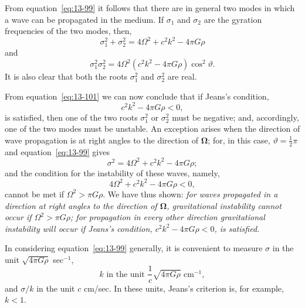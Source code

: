 From equation~\eqref{eq:13-99} it follows that there are in general two modes in which a wave can be propagated in the medium. If $\sigma_1$ and $\sigma_2$ are the gyration frequencies of the two modes, then,
\begin{equation}
\label{eq:13-100}
\sigma_1^2+\sigma_2^2 = 4\Omega^2+c^2k^2-4\pi G\rho
\end{equation}
and
\begin{equation}
\label{eq:13-101}
\sigma_1^2\sigma_2^2 = 4\Omega^2(c^2k^2-4\pi G\rho)\cos^2\!\vartheta.
\end{equation}
It is also clear that both the roots $\sigma_1^2$ and $\sigma_2^2$ are real.

From equation~\eqref{eq:13-101} we can now conclude that if Jeans's condition,
\begin{equation}
\label{eq:13-102}
c^2k^2-4\pi G\rho < 0,
\end{equation}
is satisfied, then one of the two roots $\sigma_1^2$ or $\sigma_2^2$ must be negative; and, accordingly, one of the two modes must be unstable. An exception arises when the direction of wave propagation is at right angles to the direction of $\boldsymbol{\Omega}$; for, in this case, $\vartheta = \frac{1}{2}\pi$ and equation~\eqref{eq:13-99} gives
\begin{equation}
\label{eq:13-103}
\sigma^2 = 4\Omega^2+c^2k^2-4\pi G\rho;
\end{equation}
and the condition for the instability of these waves, namely,
\begin{equation}
\label{eq:13-104}
4\Omega^2+c^2k^2-4\pi G\rho < 0,
\end{equation}
cannot be met if $\Omega^2 > \pi G\rho$. We have thus shown: \textit{for waves propagated in a direction at right angles to the direction of $\boldsymbol{\Omega}$, gravitational instability cannot occur if $\Omega^2 > \pi G\rho$; for propagation in every other direction gravitational instability will occur if Jeans's condition, $c^2k^2-4\pi G\rho < 0$, is satisfied.}

In considering equation~\eqref{eq:13-99} generally, it is convenient to measure $\sigma$ in the unit $\sqrt{4\pi G\rho}$ sec$^{-1}$,
\begin{equation}
\label{eq:13-105}
k \text{ in the unit }\frac{1}{c}\sqrt{4\pi G\rho}\text{ cm}^{-1},
\end{equation}
and $\sigma/k$ in the unit $c$ cm/sec. In these units, Jeans's criterion is, for example, $k < 1$.

